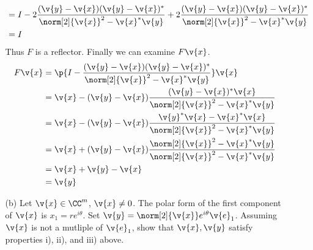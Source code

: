\documentclass[11pt]{article}
\begin{document}
\begin{enumerate}
\begin{enumerate}
\begin{align*}
                        &= I - 2\frac{(\v{y} - \v{x})(\v{y} - \v{x})^*}{\norm[2]{\v{x}}^2 - \v{x}^*\v{y}} + 2\frac{(\v{y} - \v{x})(\v{y} - \v{x})^*}{\norm[2]{\v{x}}^2 - \v{x}^*\v{y}} \\
                        &= I
                \end{align*}
                Thus $F$ is a reflector.
                Finally we can examine $F\v{x}$.
                \begin{align*}
                    F\v{x} &= \p{I - \frac{(\v{y} - \v{x})(\v{y} - \v{x})^*}{\norm[2]{\v{x}}^2 - \v{x}^*\v{y}}}\v{x} \\
                           &= \v{x} - (\v{y} - \v{x})\frac{(\v{y} - \v{x})^*\v{x}}{\norm[2]{\v{x}}^2 - \v{x}^*\v{y}} \\
                           &= \v{x} - (\v{y} - \v{x})\frac{\v{y}^* \v{x} - \v{x}^*\v{x}}{\norm[2]{\v{x}}^2 - \v{x}^*\v{y}} \\
                           &= \v{x} + (\v{y} - \v{x})\frac{\norm[2]{\v{x}}^2 - \v{x}^* \v{y}}{\norm[2]{\v{x}}^2 - \v{x}^*\v{y}} \\
                           &= \v{x} + \v{y} - \v{x} \\
                           &=  \v{y}
                \end{align*}

            \item[(b)] %
                Let $\v{x} \in \CC^m$, $\v{x} \neq 0$.
                The polar form of the first component of $\v{x}$ is
                $x_1 = re^{i\theta}$.
                Set $\v{y} = \norm[2]{\v{x}} e^{i\theta} \v{e}_1$.
                Assuming $\v{x}$ is not a mutliple of $\v{e}_1$, show that
                $\v{x}, \v{y}$ satisfy properties i), ii), and iii) above.


\end{enumerate}
\end{enumerate}
\end{document}

